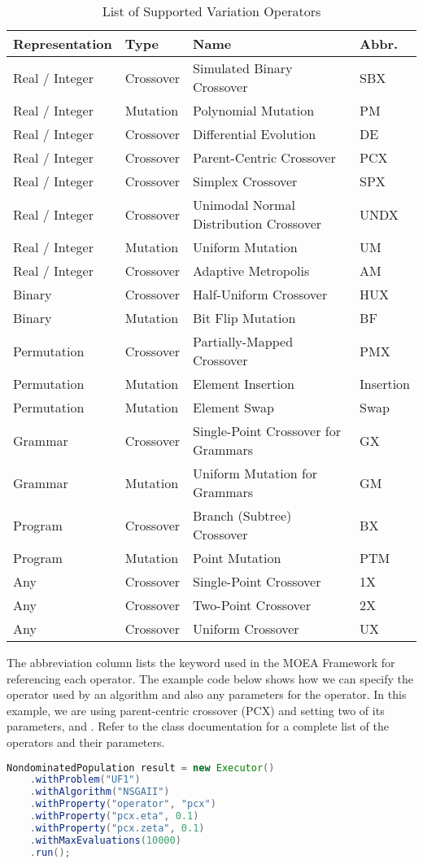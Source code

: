 \begin{table}
  \centering
  \caption{List of Supported Variation Operators}
  \label{tbl:operators}
  \begin{tabular}{llll}
    \hline
    Representation & Type & Name & Abbr. \\
    \hline
    Real / Integer & Crossover & Simulated Binary Crossover & SBX \\
    Real / Integer & Mutation & Polynomial Mutation & PM \\
    Real / Integer & Crossover & Differential Evolution & DE \\
    Real / Integer & Crossover & Parent-Centric Crossover & PCX \\
    Real / Integer & Crossover & Simplex Crossover & SPX \\
    Real / Integer & Crossover & Unimodal Normal Distribution Crossover & UNDX \\
    Real / Integer & Mutation & Uniform Mutation & UM \\
    Real / Integer & Crossover & Adaptive Metropolis & AM \\
    Binary & Crossover & Half-Uniform Crossover & HUX \\
    Binary & Mutation & Bit Flip Mutation & BF \\
    Permutation & Crossover & Partially-Mapped Crossover & PMX \\
    Permutation & Mutation & Element Insertion & Insertion \\
    Permutation & Mutation & Element Swap & Swap \\
    Grammar & Crossover & Single-Point Crossover for Grammars & GX \\
    Grammar & Mutation & Uniform Mutation for Grammars & GM \\
    Program & Crossover & Branch (Subtree) Crossover & BX \\
    Program & Mutation & Point Mutation & PTM \\
    Any & Crossover & Single-Point Crossover & 1X \\
    Any & Crossover & Two-Point Crossover & 2X \\
    Any & Crossover & Uniform Crossover & UX \\
    \hline
  \end{tabular}
\end{table}

The abbreviation column lists the keyword used in the MOEA Framework for referencing each operator.  The example code below shows how we can specify the operator used by an algorithm and also any parameters for the operator.  In this example, we are using parent-centric crossover (PCX) and setting two of its parameters,  and .  Refer to the  class documentation for a complete list of the operators and their parameters.
\begin{lstlisting}[language=Java]
NondominatedPopulation result = new Executor()
    .withProblem("UF1")
    .withAlgorithm("NSGAII")
    .withProperty("operator", "pcx")
    .withProperty("pcx.eta", 0.1)
    .withProperty("pcx.zeta", 0.1)
    .withMaxEvaluations(10000)
    .run();
\end{lstlisting}

